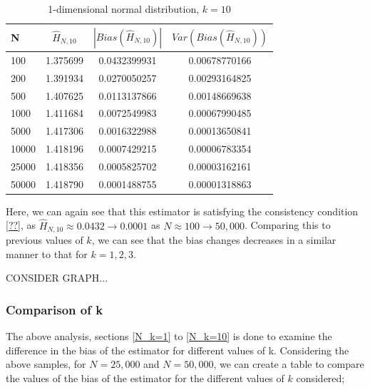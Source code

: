 \documentclass{article}
\begin{document}
\begin{table}
\caption{1-dimensional normal distribution, $k=10$} \label{normal_k=10_table}
\begin{center}
\begin{tabular}{| l | c c c|} 
\toprule
N & $\hat{H}_{N, 10}$ & $|Bias(\hat{H}_{N, 10})|$ & $Var(Bias(\hat{H}_{N, 10}))$ \\
\midrule[1pt]
100     & 1.375699     & 0.0432399931     & 0.00678770166  \\
200     & 1.391934     & 0.0270050257     & 0.00293164825  \\
500     & 1.407625     & 0.0113137866     & 0.00148669638  \\
1000    & 1.411684     & 0.0072549983     & 0.00067990485  \\
5000    & 1.417306     & 0.0016322988     & 0.00013650841  \\
10000   & 1.418196     & 0.0007429215     & 0.00006783354  \\
25000   & 1.418356     & 0.0005825702     & 0.00003162161  \\
50000   & 1.418790     & 0.0001488755     & 0.00001318863  \\
\hline
\end{tabular}
\end{center}
\end{table}

Here, we can again see that this estimator is satisfying the consistency condition \ref{??}, as $\hat{H}_{N, 10} \approx  0.0432 \to 0.0001$ as $N \approx 100 \to 50,000$. Comparing this to previous values of $k$, we can see that the bias changes decreases in a similar manner to that for $k=1, 2, 3$.

CONSIDER GRAPH...

\subsubsection{Comparison of k}

The above analysis, sections \ref{N_k=1} to \ref{N_k=10} is done to examine the difference in the bias of the estimator for different values of k. Considering the above samples, for $N=25,000$ and $N=50,000$, we can create a table to compare the values of the bias of the estimator for the different values of $k$ considered;
\end{document}

